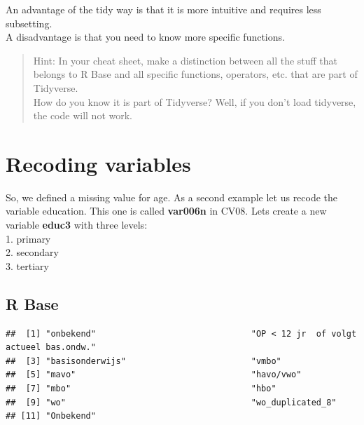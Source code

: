 \documentclass[
]{book}
\newenvironment{Shaded}{\begin{snugshade}}{\end{snugshade}}
\newcommand{\KeywordTok}[1]{\textcolor[rgb]{0.13,0.29,0.53}{\textbf{#1}}}
\newcommand{\NormalTok}[1]{#1}
\newcommand{\OperatorTok}[1]{\textcolor[rgb]{0.81,0.36,0.00}{\textbf{#1}}}
\begin{document}
An advantage of the tidy way is that it is more intuitive and requires less subsetting.\\
A disadvantage is that you need to know more specific functions.

\begin{quote}
Hint: In your cheat sheet, make a distinction between all the stuff that belongs to R Base and all specific functions, operators, etc. that are part of Tidyverse.\\
How do you know it is part of Tidyverse? Well, if you don't load tidyverse, the code will not work.
\end{quote}

\hypertarget{recoding-variables}{%
\section{Recoding variables}\label{recoding-variables}}

So, we defined a missing value for age. As a second example let us recode the variable education. This one is called \textbf{var006n} in CV08. Lets create a new variable \textbf{educ3} with three levels:\\
1. primary\\
2. secondary\\
3. tertiary

\hypertarget{r-base-1}{%
\subsection{R Base}\label{r-base-1}}

\begin{Shaded}
\end{Shaded}

\begin{verbatim}
##  [1] "onbekend"                               "OP < 12 jr  of volgt actueel bas.ondw."
##  [3] "basisonderwijs"                         "vmbo"                                  
##  [5] "mavo"                                   "havo/vwo"                              
##  [7] "mbo"                                    "hbo"                                   
##  [9] "wo"                                     "wo_duplicated_8"                       
## [11] "Onbekend"
\end{verbatim}
\end{document}
